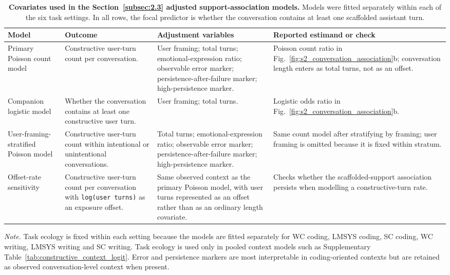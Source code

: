 \begin{table}[p]
\scriptsize
\centering
\caption{\textbf{Covariates used in the Section~\ref{subsec:2.3} adjusted support-association models.} Models were fitted separately within each of the six task settings. In all rows, the focal predictor is whether the conversation contains at least one scaffolded assistant turn.}
\label{tab:setting_model_covariates}
\setlength{\tabcolsep}{5pt}
\renewcommand{\arraystretch}{1.10}
\begin{tabularx}{\textwidth}{>{\raggedright\arraybackslash}p{}>{\raggedright\arraybackslash}p{}>{\raggedright\arraybackslash}p{}>{\raggedright\arraybackslash}X}
\toprule
Model & Outcome & Adjustment variables & Reported estimand or check \\
\midrule
Primary Poisson count model
& Constructive user-turn count per conversation.
& User framing; total turns; emotional-expression ratio; observable error marker; persistence-after-failure marker; high-persistence marker.
& Poisson count ratio in Fig.~\ref{fig:s2_conversation_association}b; conversation length enters as total turns, not as an offset. \\
\addlinespace
Companion logistic model
& Whether the conversation contains at least one constructive user turn.
& User framing; total turns.
& Logistic odds ratio in Fig.~\ref{fig:s2_conversation_association}b. \\
\addlinespace
User-framing-stratified Poisson model
& Constructive user-turn count within intentional or unintentional conversations.
& Total turns; emotional-expression ratio; observable error marker; persistence-after-failure marker; high-persistence marker.
& Same count model after stratifying by framing; user framing is omitted because it is fixed within stratum. \\
\addlinespace
Offset-rate sensitivity
& Constructive user-turn count per conversation with \texttt{log(user turns)} as an exposure offset.
& Same observed context as the primary Poisson model, with user turns represented as an offset rather than as an ordinary length covariate.
& Checks whether the scaffolded-support association persists when modelling a constructive-turn rate. \\
\bottomrule
\end{tabularx}
\vspace{2pt}
\parbox{0.94\textwidth}{\footnotesize \textit{Note.} Task ecology is fixed within each setting because the models are fitted separately for WC coding, LMSYS coding, SC coding, WC writing, LMSYS writing and SC writing. Task ecology is used only in pooled context models such as Supplementary Table~\ref{tab:constructive_context_logit}. Error and persistence markers are most interpretable in coding-oriented contexts but are retained as observed conversation-level context when present.}
\end{table}
